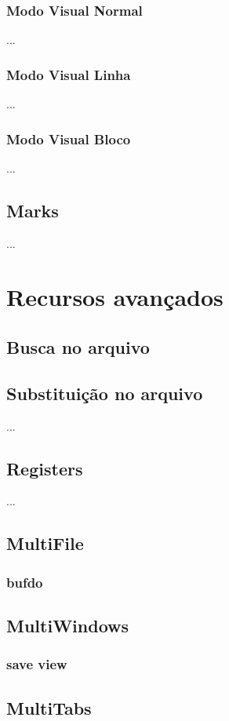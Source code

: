 \documentclass[a4paper, 12pt]{article}
\begin{document}
\subsubsection{Modo Visual Normal}
...

\subsubsection{Modo Visual Linha}
...

\subsubsection{Modo Visual Bloco}
...

\subsection{Marks}
...

\newpage
\section{Recursos avançados}
\subsection{Busca no arquivo}
\subsection{Substituição no arquivo}
...
\subsection{Registers}
...
\subsection{MultiFile}
\subsubsection{bufdo}

\subsection{MultiWindows}
\subsubsection{save view}

\subsection{MultiTabs}
\end{document}

